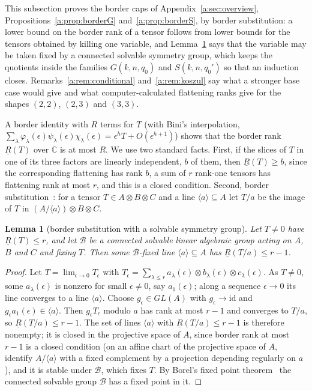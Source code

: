 \documentclass[11pt]{article}
\newtheorem{lemma}[theorem]{Lemma}
\theoremstyle{definition}
\theoremstyle{remark}
\begin{document}
This subsection proves the border caps of Appendix~\ref{a:sec:overview}, Propositions~\ref{a:prop:borderG} and~\ref{a:prop:borderS}, by border substitution: a lower bound on the border rank of a tensor follows from lower bounds for the tensors obtained by killing one variable, and Lemma~\ref{a:lem:subst} says that the variable may be taken fixed by a connected solvable symmetry group, which keeps the quotients inside the families $G(k,n,q_0)$ and $S(k,n,q_0')$ so that an induction closes. Remarks~\ref{a:rem:conditional} and~\ref{a:rem:koszul} say what a stronger base case would give and what computer-calculated flattening ranks give for the shapes $(2,2)$, $(2,3)$ and $(3,3)$.

A border identity with $R$ terms for $T$ (with Bini's interpolation, $\sum_\lambda\varphi_\lambda(\epsilon)\psi_\lambda(\epsilon)\chi_\lambda(\epsilon)=\epsilon^hT+O(\epsilon^{h+1})$) shows that the border rank $\underline R(T)$ over $\mathbb C$ is at most $R$. We use two standard facts. First, if the slices of $T$ in one of its three factors are linearly independent, $b$ of them, then $\underline R(T)\ge b$, since the corresponding flattening has rank $b$, a sum of $r$ rank-one tensors has flattening rank at most $r$, and this is a closed condition. Second, border substitution~\cite{LM17}: for a tensor $T\in A\otimes B\otimes C$ and a line $\langle a\rangle\subseteq A$ let $T/a$ be the image of $T$ in $(A/\langle a\rangle)\otimes B\otimes C$.

\begin{lemma}[border substitution with a solvable symmetry group]\label{a:lem:subst}
Let $T\ne0$ have $\underline R(T)\le r$, and let $\mathcal B$ be a connected solvable linear algebraic group acting on $A$, $B$ and $C$ and fixing $T$. Then some $\mathcal B$-fixed line $\langle a\rangle\subseteq A$ has $\underline R(T/a)\le r-1$.
\end{lemma}

\begin{proof}
Let $T=\lim_{\epsilon\to0}T_\epsilon$ with $T_\epsilon=\sum_{\lambda\le r}a_\lambda(\epsilon)\otimes b_\lambda(\epsilon)\otimes c_\lambda(\epsilon)$. As $T\ne0$, some $a_\lambda(\epsilon)$ is nonzero for small $\epsilon\ne0$, say $a_1(\epsilon)$; along a sequence $\epsilon\to0$ its line converges to a line $\langle a\rangle$. Choose $g_\epsilon\in GL(A)$ with $g_\epsilon\to\mathrm{id}$ and $g_\epsilon a_1(\epsilon)\in\langle a\rangle$. Then $g_\epsilon T_\epsilon$ modulo $a$ has rank at most $r-1$ and converges to $T/a$, so $\underline R(T/a)\le r-1$. The set of lines $\langle a\rangle$ with $\underline R(T/a)\le r-1$ is therefore nonempty; it is closed in the projective space of $A$, since border rank at most $r-1$ is a closed condition (on an affine chart of the projective space of $A$, identify $A/\langle a\rangle$ with a fixed complement by a projection depending regularly on $a$), and it is stable under $\mathcal B$, which fixes $T$. By Borel's fixed point theorem~\cite[Section 21]{Hum75} the connected solvable group $\mathcal B$ has a fixed point in it.
\end{proof}
\end{document}
